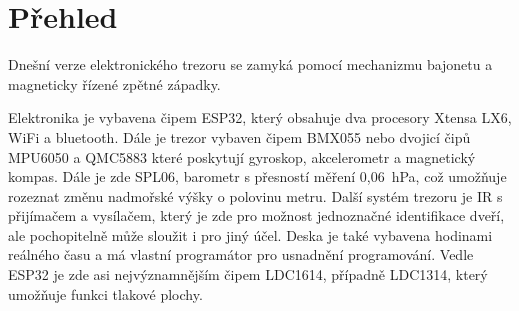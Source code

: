 \section{Přehled}

Dnešní verze elektronického trezoru se zamyká pomocí mechanizmu bajonetu a magneticky řízené zpětné západky. 

Elektronika je vybavena čipem ESP32,
který obsahuje dva procesory Xtensa LX6, WiFi a bluetooth. Dále je trezor vybaven čipem BMX055 nebo dvojicí čipů MPU6050 a QMC5883 které poskytují 
gyroskop, akcelerometr a magnetický kompas. Dále je zde SPL06, barometr s přesností měření 0,06~hPa, což umožňuje rozeznat změnu nadmořské výšky 
o polovinu metru. Další systém trezoru je IR s přijímačem a vysílačem, který je zde pro možnost jednoznačné identifikace dveří, ale pochopitelně může 
sloužit i pro jiný účel. Deska je také vybavena hodinami reálného času a má vlastní programátor pro usnadnění programování. Vedle ESP32 je zde asi 
nejvýznamnějším čipem LDC1614, případně LDC1314, který umožňuje funkci tlakové plochy.


\begin{table}[h]
    \centering
    \caption{Shrnutí elektronického vybavení}
    \label{tab:COMPARATION}
\end{table}

\newpage